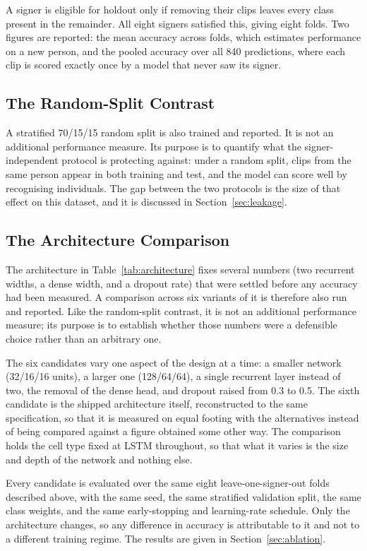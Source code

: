 A signer is eligible for holdout only if removing their clips leaves every class present in the remainder. All eight signers satisfied this, giving eight folds. Two figures are reported: the mean accuracy across folds, which estimates performance on a new person, and the pooled accuracy over all 840 predictions, where each clip is scored exactly once by a model that never saw its signer.

\subsection{The Random-Split Contrast}

A stratified 70/15/15 random split is also trained and reported. It is not an additional performance measure. Its purpose is to quantify what the signer-independent protocol is protecting against: under a random split, clips from the same person appear in both training and test, and the model can score well by recognising individuals. The gap between the two protocols is the size of that effect on this dataset, and it is discussed in Section~\ref{sec:leakage}.

\subsection{The Architecture Comparison}
\label{sec:archcompare}

The architecture in Table~\ref{tab:architecture} fixes several numbers (two recurrent widths, a dense width, and a dropout rate) that were settled before any accuracy had been measured. A comparison across six variants of it is therefore also run and reported. Like the random-split contrast, it is not an additional performance measure; its purpose is to establish whether those numbers were a defensible choice rather than an arbitrary one.

The six candidates vary one aspect of the design at a time: a smaller network (32/16/16 units), a larger one (128/64/64), a single recurrent layer instead of two, the removal of the dense head, and dropout raised from 0.3 to 0.5. The sixth candidate is the shipped architecture itself, reconstructed to the same specification, so that it is measured on equal footing with the alternatives instead of being compared against a figure obtained some other way. The comparison holds the cell type fixed at LSTM throughout, so that what it varies is the size and depth of the network and nothing else.

Every candidate is evaluated over the same eight leave-one-signer-out folds described above, with the same seed, the same stratified validation split, the same class weights, and the same early-stopping and learning-rate schedule. Only the architecture changes, so any difference in accuracy is attributable to it and not to a different training regime. The results are given in Section~\ref{sec:ablation}.

